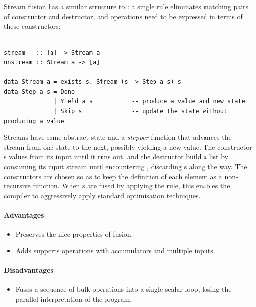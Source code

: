 Stream fusion has a similar structure to : a single rule
eliminates matching pairs of constructor and destructor, and operations need to
be expressed in terms of these constructors:
%
\begin{lstlisting}[style=Haskell,numbers=none,mathescape,caption={The \emph{stream fusion} transformation}]
%\bf$\langle$ stream fusion $\rangle$% forall s. stream (unstream s) $\mapsto$ s

stream   :: [a] -> Stream a
unstream :: Stream a -> [a]

data Stream a = exists s. Stream (s -> Step a s) s
data Step a s = Done
              | Yield a s           -- produce a value and new state
              | Skip s              -- update the state without producing a value
\end{lstlisting}

Streams have some abstract state and a \emph{stepper} function that advances the
stream from one state to the next, possibly yielding a new value. The
 constructor s values from its input until it runs
out, and the  destructor build a list by consuming its input
stream until encountering , discarding s along the
way. The  constructors are chosen so as to keep the definition of
each element as a non-recursive function. When s are fused by
applying the rule, this enables the compiler to aggressively apply standard
optimisation techniques.

\paragraph{Advantages}
\begin{itemize}
    \item Preserves the nice properties of
         fusion.
    \item Adds supports operations with accumulators and multiple inputs.
\end{itemize}

\paragraph{Disadvantages}
\begin{itemize}
    \item Fuses a sequence of bulk operations into a single scalar loop, losing
        the parallel interpretation of the program.
\end{itemize}



